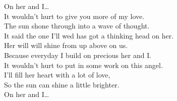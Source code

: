 On her and I… \\

It wouldn't hurt to give you more of my love. \\
The sun shone through into a wave of thought. \\
It said the one I'll wed has got a thinking head on her. \\
Her will will shine from up above on us. \\

Because everyday I build on precious her and I. \\
It wouldn't hurt to put in some work on this angel. \\
I'll fill her heart with a lot of love, \\
So the sun can shine a little brighter. \\

On her and I… \\
